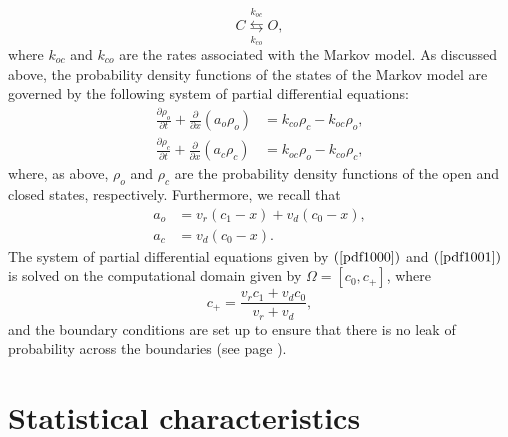 \begin{equation}
C\underset{k_{co}}{\overset{k_{oc}}{\leftrightarrows}}O, \label{M100}%
\end{equation}
where $k_{oc}$ and $k_{co}$ are the rates associated with the Markov model. As
discussed above, the probability density functions of the states of the Markov
model are governed by the following system of partial differential equations:%
\begin{align}
\frac{\partial\rho_{o}}{\partial t}+\frac{\partial}{\partial x}\left(
a_{o}\rho_{o}\right)   &  =k_{co}\rho_{c}-k_{oc}\rho_{o},\label{pdf1000}\\
\frac{\partial\rho_{c}}{\partial t}+\frac{\partial}{\partial x}\left(
a_{c}\rho_{c}\right)   &  =k_{oc}\rho_{o}-k_{co}\rho_{c}, \label{pdf1001}%
\end{align}
where, as above, $\rho_{o}$ and $\rho_{c}$ are the probability density
functions of the open and closed states, respectively. Furthermore, we recall
that%
\begin{align}
a_{o}  &  =v_{r}(c_{1}-x)+v_{d}(c_{0}-x),\label{aos}\\
a_{c}  &  =v_{d}(c_{0}-x). \label{acs}%
\end{align}
The system of partial differential equations given by $\left(
\ref{pdf1000}\right)$ and $\left(\ref{pdf1001}\right)  $ is solved on the computational
domain given by $\Omega=[c_0,c_+]$, where
\[
c_{+}=\frac{v_{r}c_{1}+v_{d}c_{0}}{v_{r}+v_{d}},%
\]
and the boundary conditions are set up to ensure that there is no leak of probability across the
boundaries (see page \pageref{bc}).

\section{Statistical characteristics \label{statistics}}

